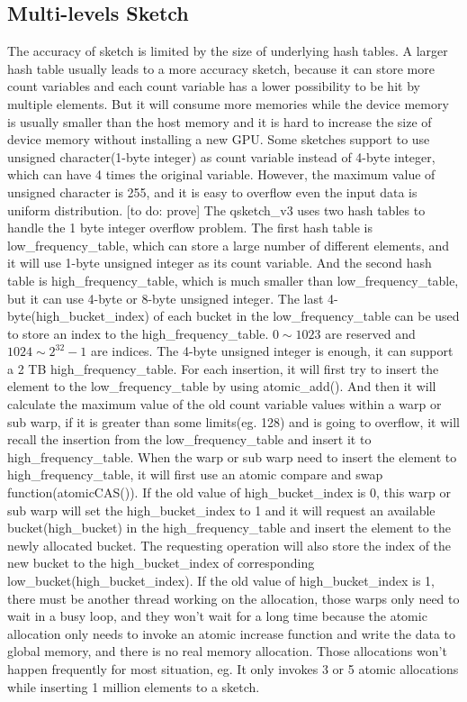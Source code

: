 \documentclass[conference]{IEEEtran}
\begin{document}
\subsection{Multi-levels Sketch}
The accuracy of sketch is limited by the size of underlying hash tables. A larger hash table usually leads to a more accuracy sketch, because it can store more count variables and each count variable has a lower possibility to be hit by multiple elements. But it will consume more memories while the device memory is usually smaller than the host memory and it is hard to increase the size of device memory without installing a new GPU. Some sketches support to use unsigned character(1-byte integer) as count variable instead of 4-byte integer, which can have 4 times the original variable. However, the maximum value of unsigned character is 255, and it is easy to overflow even the input data is uniform distribution.
[to do:  prove]
The qsketch\_v3 uses two hash tables to handle the 1 byte integer overflow problem. The first hash table is low\_frequency\_table, which can store a large number of different elements, and it will use 1-byte unsigned integer as its count variable. And the second hash table is high\_frequency\_table, which is much smaller than low\_frequency\_table, but it can use 4-byte or 8-byte unsigned integer. The last 4-byte(high\_bucket\_index) of each bucket in the low\_frequency\_table can be used to store an index to the high\_frequency\_table. $0 \sim 1023$ are reserved and $1024 \sim 2 ^ {32} - 1$ are indices. The 4-byte unsigned integer is enough, it can support a 2 TB high\_frequency\_table.
For each insertion, it will first try to insert the element to the low\_frequency\_table by using atomic\_add(). And then it will calculate the maximum value of the old count variable values within a warp or sub warp, if it is greater than some limits(eg. 128) and is going to overflow, it will recall the insertion from the low\_frequency\_table and insert it to high\_frequency\_table. 
When the warp or sub warp need to insert the element to high\_frequency\_table, it will first use an atomic compare and swap function(atomicCAS()). If the old value of high\_bucket\_index is 0, this warp or sub warp will set the high\_bucket\_index to 1 and it will request an available bucket(high\_bucket) in the high\_frequency\_table and insert the element to the newly allocated bucket. The requesting operation will also store the index of the new bucket to the high\_bucket\_index of corresponding low\_bucket(high\_bucket\_index). 
If the old value of high\_bucket\_index is 1, there must be another thread working on the allocation, those warps only need to wait in a busy loop, and they won't wait for a long time because the atomic allocation only needs to invoke an atomic increase function and write the data to global memory, and there is no real memory allocation. Those allocations won't happen frequently for most situation, eg. It only invokes 3 or 5 atomic allocations while inserting 1 million elements to a sketch.  %
\end{document}
